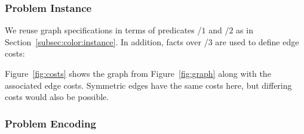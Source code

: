 \subsubsection{Problem Instance}\label{subsec:tsp:instance}


We reuse graph specifications in terms of predicates /$1$ and /$2$
as in Section~\ref{subsec:color:instance}.
In addition, facts over %
/$3$ are used to define edge costs:
%

%
Figure~\ref{fig:costs} shows the %
graph from Figure~\ref{fig:graph}
along with the associated edge costs.
Symmetric edges have the same costs here,
but differing costs would also be possible.


\subsubsection{Problem Encoding}\label{subsec:tsp:encoding}


